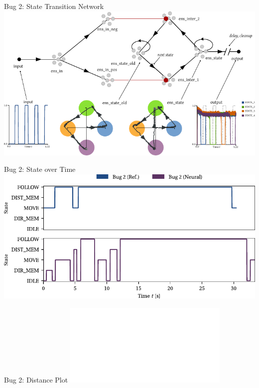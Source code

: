 \documentclass[aspectratio=169]{beamer}
\begin{document}
\begin{frame}{Bug 2: State Transition Network}
	\centering
	\includegraphics{media/nengo_state_network.pdf}
\end{frame}


\begin{frame}{Bug 2: State over Time}
	\centering
	\includegraphics{media/vis_trace_map_demo_03_bug_2_ref_bug_2_neural.pdf}
\end{frame}

\begin{frame}{Bug 2: Distance Plot}
	\centering
	\includegraphics<1>{media/vis_dist_map_demo_03_bug_2_neural_bug_2_ref.pdf}
\end{frame}
\end{document}
